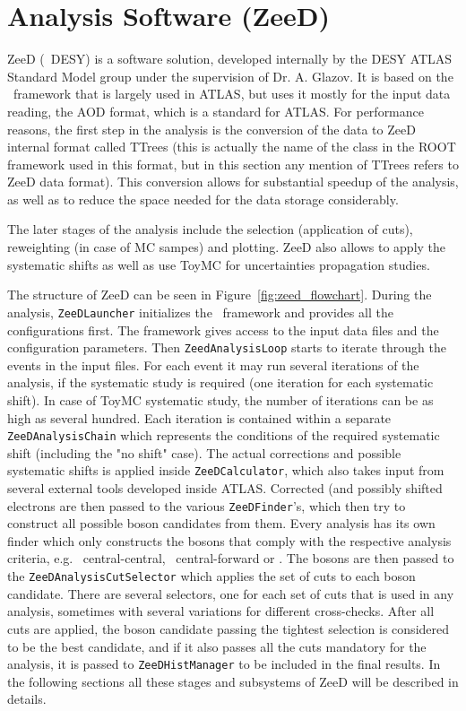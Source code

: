 \chapter{Analysis Software (ZeeD)}
\label{sec:ZeeD}
ZeeD (\Zee\ DESY) is a software solution, developed internally by the DESY ATLAS Standard Model group under the supervision of Dr. A. Glazov. It is based on the \Athena\ framework that is largely used in ATLAS, but uses it mostly for the input data reading, the AOD format, which is a standard for ATLAS. For performance reasons, the first step in the analysis is the conversion of the data to ZeeD internal format called TTrees (this is actually the name of the class in the ROOT framework used in this format, but in this section any mention of TTrees refers to ZeeD data format). This conversion allows for substantial speedup of the analysis, as well as to reduce the space needed for the data storage considerably.

The later stages of the analysis include the selection (application of cuts), reweighting (in case of MC sampes) and plotting. ZeeD also allows to apply the systematic shifts as well as use ToyMC for uncertainties propagation studies.

The structure of ZeeD can be seen in Figure~\ref{fig:zeed_flowchart}. During the analysis, \texttt{ZeeDLauncher} initializes the \Athena\ framework and provides all the configurations first. The framework gives access to the input data files and the configuration parameters. Then \texttt{ZeedAnalysisLoop} starts to iterate through the events in the input files. For each event it may run several iterations of the analysis, if the systematic study is required (one iteration for each systematic shift). In case of ToyMC systematic study, the number of iterations can be as high as several hundred. Each iteration is contained within a separate \texttt{ZeeDAnalysisChain} which represents the conditions of the required systematic shift (including the "no shift" case). The actual corrections and possible systematic shifts is applied inside \texttt{ZeeDCalculator}, which also takes input from several external tools developed inside ATLAS. Corrected (and possibly shifted electrons are then passed to the various \texttt{ZeeDFinder}'s, which then try to construct all possible boson candidates from them. Every analysis has its own finder which only constructs the bosons that comply with the respective analysis criteria, e.g. \Zee\ central-central, \Zee\ central-forward or \Wenu. The bosons are then passed to the \texttt{ZeeDAnalysisCutSelector} which applies the set of cuts to each boson candidate. There are several selectors, one for each set of cuts that is used in any analysis, sometimes with several variations for different cross-checks. After all cuts are applied, the boson candidate passing the tightest selection is considered to be the best candidate, and if it also passes all the cuts mandatory for the analysis, it is passed to \texttt{ZeeDHistManager} to be included in the final results. In the following sections all these stages and subsystems of ZeeD will be described in details.

